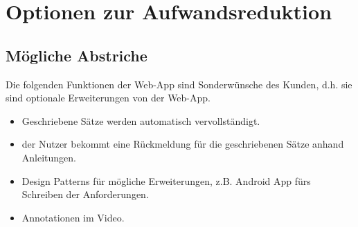 \section{Optionen zur Aufwandsreduktion}

	\subsection{Mögliche Abstriche}
	Die folgenden Funktionen der Web-App sind Sonderwünsche des Kunden, d.h. sie sind optionale Erweiterungen von der Web-App.
	\begin{itemize}
		\item Geschriebene Sätze werden automatisch vervollständigt.
		\item der Nutzer bekommt eine Rückmeldung für die geschriebenen Sätze anhand Anleitungen.
		\item Design Patterns für mögliche Erweiterungen, z.B. Android App fürs Schreiben der Anforderungen.
		\item Annotationen im Video.
	\end{itemize}
	
